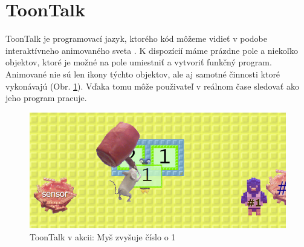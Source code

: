 \documentclass[slovak,a4paper,10pt]{article}
\begin{document}
\section{ToonTalk}
ToonTalk je programovací jazyk, ktorého kód môžeme vidieť v podobe interaktívneho animovaného sveta \cite{kahn1999computer}. K dispozícií máme prázdne pole a niekoľko objektov, ktoré je možné na pole umiestniť a vytvoriť funkčný program. Animované nie sú len ikony týchto objektov, ale aj samotné činnosti ktoré vykonávajú (Obr. \ref{fig:obr1}). Vďaka tomu môže použivateľ v reálnom čase sledovať ako jeho program pracuje.
\begin{figure}[h]
\includegraphics[scale=0.4]{toontalkmain}
\centering
\caption{ToonTalk v akcii: Myš zvyšuje číslo o 1}
\label{fig:obr1}
\end{figure}
\end{document}
